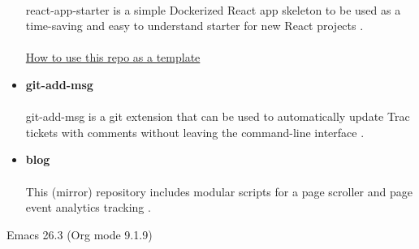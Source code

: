 \documentclass[11pt]{article}
\begin{document}
\begin{itemize}
\paragraph{}
react-app-starter is a simple Dockerized React app skeleton to be used as a time-saving and easy to understand starter for new React projects \cite{react-app-starter}.
\paragraph{}
\href{https://docs.github.com/en/github/creating-cloning-and-archiving-repositories/creating-a-repository-on-github/creating-a-repository-from-a-template}{How to use this repo as a template}
\item \textbf{git-add-msg}
\paragraph{}
git-add-msg is a git extension that can be used to automatically update Trac tickets with comments without leaving the command-line interface \cite{git-add-msg}.
\item \textbf{blog}
\paragraph{}
This (mirror) repository includes modular scripts for a page scroller and page event analytics tracking \cite{blog}.
\end{itemize}

\begin{LaTeX}
\begin{sloppypar}


\end{sloppypar}
\end{LaTeX}
Emacs 26.3 (Org mode 9.1.9)
\end{document}
